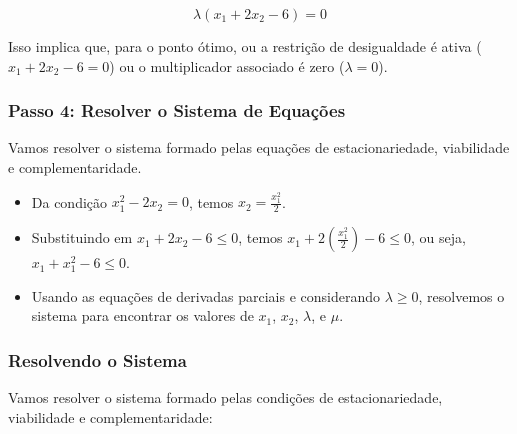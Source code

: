 \documentclass[a4paper, 12pt]{article}
\begin{document}
\begin{equation*}
    \lambda (x_1 + 2x_2 - 6) = 0
\end{equation*}

Isso implica que, para o ponto \'otimo, ou a restri\c{c}\~ao de desigualdade \'e ativa ($x_1 + 2x_2 - 6 = 0$) ou o multiplicador associado \'e zero ($\lambda = 0$).

\subsubsection{Passo 4: Resolver o Sistema de Equa\c{c}\~oes}
Vamos resolver o sistema formado pelas equa\c{c}\~oes de estacionariedade, viabilidade e complementaridade.

\begin{itemize}
    \item Da condi\c{c}\~ao $x_1^2 - 2x_2 = 0$, temos $x_2 = \frac{x_1^2}{2}$.
    \item Substituindo em $x_1 + 2x_2 - 6 \leq 0$, temos $x_1 + 2\left(\frac{x_1^2}{2}\right) - 6 \leq 0$, ou seja, $x_1 + x_1^2 - 6 \leq 0$.
    \item Usando as equa\c{c}\~oes de derivadas parciais e considerando $\lambda \geq 0$, resolvemos o sistema para encontrar os valores de $x_1$, $x_2$, $\lambda$, e $\mu$.
\end{itemize}

\subsubsection{Resolvendo o Sistema}

Vamos resolver o sistema formado pelas condições de estacionariedade, viabilidade e complementaridade:
\end{document}
